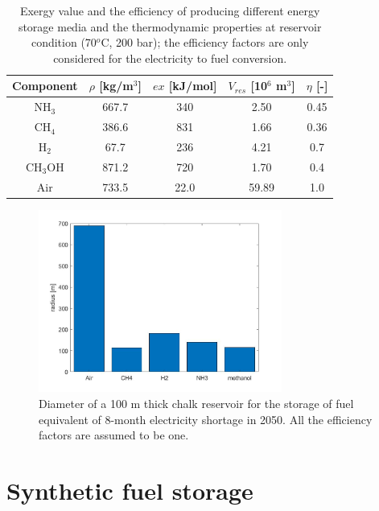 \documentclass{ECOS_2021}
\begin{document}
\begin{table}[H]
\caption{\label{tab:Exergy-value-efficiency}Exergy value and the efficiency
of producing different energy storage media and the thermodynamic
properties at reservoir condition (70$^{o}$C, 200 bar); the efficiency
factors are only considered for the electricity to fuel conversion.}

\begin{tabular}{ccccc}
\hline 
Component & $\rho$ {[}kg/m$^{3}${]} & $ex$ {[}kJ/mol{]} & $V_{res}$ {[}10$^{6}$ m$^{3}${]} & $\eta$ {[}-{]}\tabularnewline
\hline 
NH$_{3}$ & 667.7 & 340 & 2.50 & 0.45\tabularnewline
CH$_{4}$ & 386.6 & 831 & 1.66 & 0.36\tabularnewline
H$_{2}$ & 67.7 & 236 & 4.21 & 0.7\tabularnewline
CH$_{3}$OH & 871.2 & 720 & 1.70 & 0.4\tabularnewline
Air & 733.5 & 22.0 & 59.89 & 1.0\tabularnewline
\hline 
\end{tabular}
\end{table}

\begin{figure}[H]
\includegraphics[width=8cm]{res_radius_8month_storage}

\caption{\label{fig:Diameter-reservoir}Diameter of a 100 m thick chalk reservoir
for the storage of fuel equivalent of 8-month electricity shortage
in 2050. All the efficiency factors are assumed to be one.}
\end{figure}


\sffamily \Large \section{Synthetic fuel storage}
\rmfamily \normalsize
\end{document}
